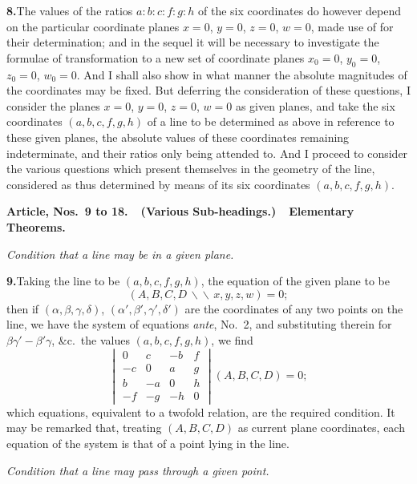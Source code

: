 \documentclass[11pt,a4paper]{article}
\begin{document}
\textbf{8.}\quad The values of the ratios $a : b : c : f : g : h$ of the six
coordinates do however depend on the particular coordinate planes $x = 0$,
$y = 0$, $z = 0$, $w = 0$, made use of for their determination; and in the
sequel it will be necessary to investigate the formulae of transformation to a
new set of coordinate planes $x_{0} = 0$, $y_{0} = 0$, $z_{0} = 0$, $w_{0} = 0$.
And I shall also show in what manner the absolute magnitudes of the
coordinates may be fixed. But deferring the consideration of these questions, I
consider the planes $x = 0$, $y = 0$, $z = 0$, $w = 0$ as given planes, and
take the six coordinates $(a, b, c, f, g, h)$ of a line to be determined as
above in reference to these given planes, the absolute values of these
coordinates remaining indeterminate, and their ratios only being attended to.
And I proceed to consider the various questions which present themselves in
the geometry of the line, considered as thus determined by means of its six
coordinates $(a, b, c, f, g, h)$.

\medskip
\noindent\textbf{Article, Nos.~9 to 18.\ \ (Various Sub-headings.)\ \ Elementary
Theorems.}
\medskip

\noindent\textit{Condition that a line may be in a given plane.}
\medskip

\textbf{9.}\quad Taking the line to be $(a, b, c, f, g, h)$, the equation of
the given plane to be
\[
(A, B, C, D \,\backslash\!\!\backslash\, x, y, z, w) = 0;
\]
then if $(\alpha, \beta, \gamma, \delta)$, $(\alpha', \beta', \gamma', \delta')$
are the coordinates of any two points on the line, we have the system of
equations \textit{ante}, No.~2, and substituting therein for
$\beta\gamma' - \beta'\gamma$, \&c.\ the values $(a, b, c, f, g, h)$, we find
\[
\begin{vmatrix}
0 & c & -b & f \\
-c & 0 & a & g \\
b & -a & 0 & h \\
-f & -g & -h & 0
\end{vmatrix}(A, B, C, D) = 0;
\]
which equations, equivalent to a twofold relation, are the required condition.
It may be remarked that, treating $(A, B, C, D)$ as current plane coordinates,
each equation of the system is that of a point lying in the line.

\medskip
\noindent\textit{Condition that a line may pass through a given point.}
\medskip
\end{document}
